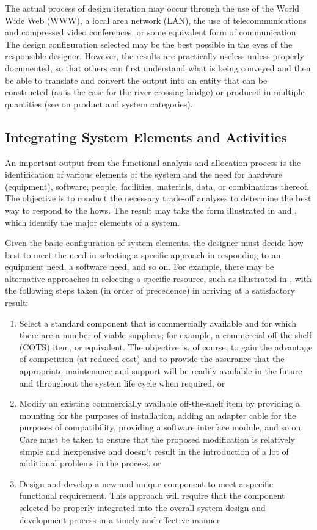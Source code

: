The actual process of design iteration may occur through the use of the World Wide Web (WWW), a local area network (LAN), the use of telecommunications and compressed video conferences, or some equivalent form of communication. The design configuration selected may be the best possible in the eyes of the responsible designer. However, the results are practically useless unless properly documented, so that others can first understand what is being conveyed and then be able to translate and convert the output into an entity that can be constructed (as is the case for the river crossing bridge) or produced in multiple quantities (see on product and system categories).

\subsection{Integrating System Elements and Activities}

An important output from the functional analysis and allocation process is the identification of various elements of the system and the need for hardware (equipment), software, people, facilities, materials, data, or combinations thereof. The objective is to conduct the necessary trade-off analyses to determine the best way to respond to the hows. The result may take the form illustrated in and , which identify the major elements of a system.

Given the basic configuration of system elements, the designer must decide how best to meet the need in selecting a specific approach in responding to an equipment need, a software need, and so on. For example, there may be alternative approaches in selecting a specific resource, such as illustrated in , with the following steps taken (in order of precedence) in arriving at a satisfactory result:

\begin{enumerate}
\item Select a standard component that is commercially available and for which there are a number of viable suppliers; for example, a commercial off-the-shelf (COTS) item, or equivalent. The objective is, of course, to gain the advantage of competition (at reduced cost) and to provide the assurance that the appropriate maintenance and support will be readily available in the future and throughout the system life cycle when required, or
\item Modify an existing commercially available off-the-shelf item by providing a mounting for the purposes of installation, adding an adapter cable for the purposes of compatibility, providing a software interface module, and so on. Care must be taken to ensure that the proposed modification is relatively simple and inexpensive and doesn’t result in the introduction of a lot of additional problems in the process, or
\item Design and develop a new and unique component to meet a specific functional requirement. This approach will require that the component selected be properly integrated into the overall system design and development process in a timely and effective manner
\end{enumerate}

